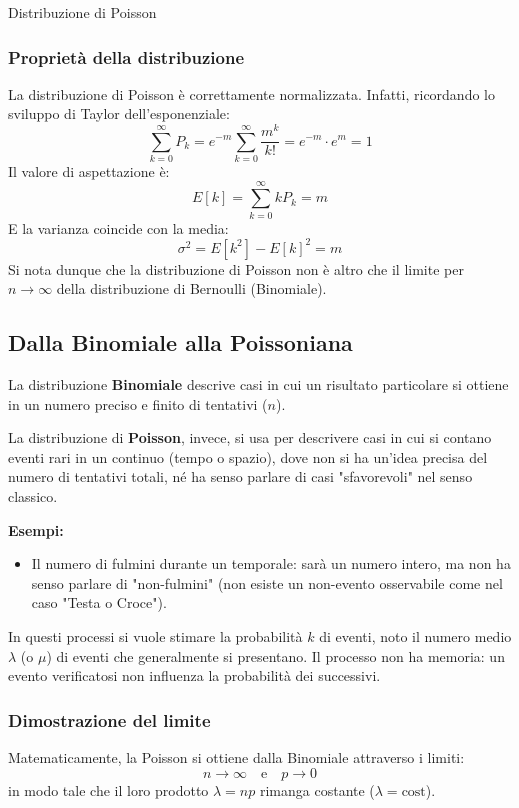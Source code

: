 \documentclass[openany,a4paper,12pt]{book}
\theoremstyle{remark}
\begin{document}
\begin{bressan}{Distribuzione di Poisson}
\subsubsection*{Proprietà della distribuzione}
La distribuzione di Poisson è correttamente normalizzata. Infatti, ricordando lo sviluppo di Taylor dell'esponenziale:
\[
\sum_{k=0}^{\infty}P_k = e^{-m} \sum_{k=0}^{\infty}\frac{m^k}{k!} = e^{-m} \cdot e^m = 1
\]
Il valore di aspettazione è:
\[
E[k]=\sum_{k=0}^{\infty}k P_k = m 
\]
E la varianza coincide con la media:
\[
{\sigma^2}=E[k^2]-{E[k]}^2=m
\]
Si nota dunque che la distribuzione di Poisson non è altro che il limite per $n \rightarrow \infty$ della distribuzione di Bernoulli (Binomiale).
\end{bressan}
\subsection*{Dalla Binomiale alla Poissoniana}
La distribuzione \textbf{Binomiale} descrive casi in cui un risultato particolare si ottiene in un numero preciso e finito di tentativi ($n$).

La distribuzione di \textbf{Poisson}, invece, si usa per descrivere casi in cui si contano eventi rari in un continuo (tempo o spazio), dove non si ha un'idea precisa del numero di tentativi totali, né ha senso parlare di casi "sfavorevoli" nel senso classico.

\textbf{Esempi:}
\begin{itemize}
    \item Il numero di fulmini durante un temporale: sarà un numero intero, ma non ha senso parlare di "non-fulmini" (non esiste un non-evento osservabile come nel caso "Testa o Croce").
\end{itemize}
In questi processi si vuole stimare la probabilità $k$ di eventi, noto il numero medio $\lambda$ (o $\mu$) di eventi che generalmente si presentano. Il processo non ha memoria: un evento verificatosi non influenza la probabilità dei successivi.

\subsubsection*{Dimostrazione del limite}
Matematicamente, la Poisson si ottiene dalla Binomiale attraverso i limiti:
\[
n \to \infty \quad \text{e} \quad p \to 0
\]
in modo tale che il loro prodotto $\lambda = np$ rimanga costante ($\lambda = \text{cost}$).
\end{document}
